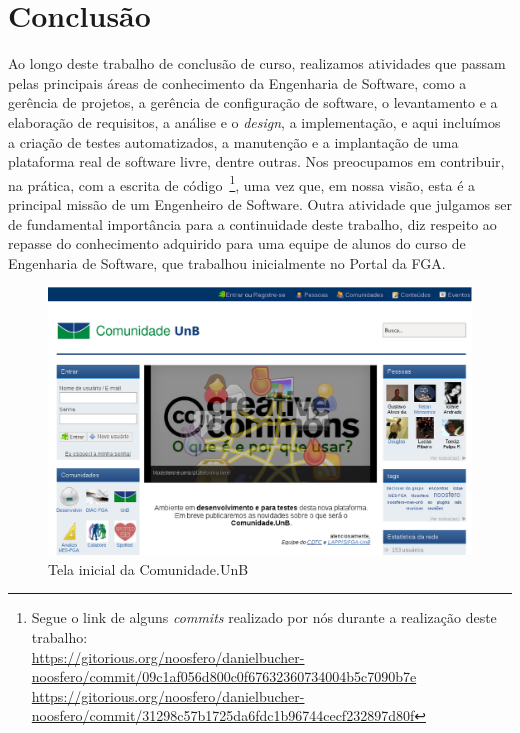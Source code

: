 \chapter{Conclusão}
\label{cap:conclusao}

Ao longo deste trabalho de conclusão de curso, realizamos atividades que passam
pelas principais áreas de conhecimento da Engenharia de Software, como a
gerência de projetos, a gerência de configuração de software,
o levantamento e a elaboração de requisitos, a análise e o \textit{design},
a implementação, e aqui incluímos a criação de testes automatizados,
a manutenção e a implantação de uma plataforma real de software livre, dentre
outras.
%
Nos preocupamos em contribuir, na prática, com a escrita de código~\footnote{%
Segue o link de alguns \textit{commits} realizado por nós durante a realização
deste trabalho: \\
\url{https://gitorious.org/noosfero/danielbucher-noosfero/commit/09c1af056d800c0f67632360734004b5c7090b7e}\\
\url{https://gitorious.org/noosfero/danielbucher-noosfero/commit/31298c57b1725da6fdc1b96744cecf232897d80f}},
uma vez que, em nossa visão, esta é a principal missão de um Engenheiro de
Software.
%
Outra atividade que julgamos ser de fundamental importância para a continuidade
deste trabalho, diz respeito ao repasse do conhecimento adquirido para uma
equipe de alunos do curso de Engenharia de Software, que trabalhou inicialmente
no Portal da FGA.


\begin{figure}[h!]
	\centering
	\includegraphics[keepaspectratio=true,scale=0.45]
	  {figuras/comunidade-unb.eps}
	\caption{Tela inicial da Comunidade.UnB}
	\label{homepage:comunidade.unb}
\end{figure}

